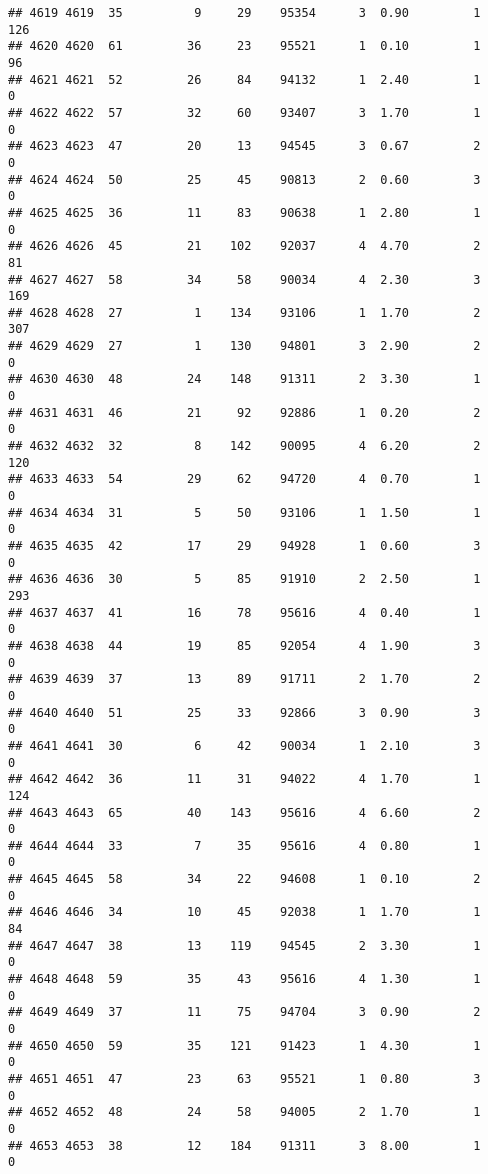 \documentclass[
]{article}
\begin{document}
\begin{verbatim}
## 4619 4619  35          9     29    95354      3  0.90         1      126
## 4620 4620  61         36     23    95521      1  0.10         1       96
## 4621 4621  52         26     84    94132      1  2.40         1        0
## 4622 4622  57         32     60    93407      3  1.70         1        0
## 4623 4623  47         20     13    94545      3  0.67         2        0
## 4624 4624  50         25     45    90813      2  0.60         3        0
## 4625 4625  36         11     83    90638      1  2.80         1        0
## 4626 4626  45         21    102    92037      4  4.70         2       81
## 4627 4627  58         34     58    90034      4  2.30         3      169
## 4628 4628  27          1    134    93106      1  1.70         2      307
## 4629 4629  27          1    130    94801      3  2.90         2        0
## 4630 4630  48         24    148    91311      2  3.30         1        0
## 4631 4631  46         21     92    92886      1  0.20         2        0
## 4632 4632  32          8    142    90095      4  6.20         2      120
## 4633 4633  54         29     62    94720      4  0.70         1        0
## 4634 4634  31          5     50    93106      1  1.50         1        0
## 4635 4635  42         17     29    94928      1  0.60         3        0
## 4636 4636  30          5     85    91910      2  2.50         1      293
## 4637 4637  41         16     78    95616      4  0.40         1        0
## 4638 4638  44         19     85    92054      4  1.90         3        0
## 4639 4639  37         13     89    91711      2  1.70         2        0
## 4640 4640  51         25     33    92866      3  0.90         3        0
## 4641 4641  30          6     42    90034      1  2.10         3        0
## 4642 4642  36         11     31    94022      4  1.70         1      124
## 4643 4643  65         40    143    95616      4  6.60         2        0
## 4644 4644  33          7     35    95616      4  0.80         1        0
## 4645 4645  58         34     22    94608      1  0.10         2        0
## 4646 4646  34         10     45    92038      1  1.70         1       84
## 4647 4647  38         13    119    94545      2  3.30         1        0
## 4648 4648  59         35     43    95616      4  1.30         1        0
## 4649 4649  37         11     75    94704      3  0.90         2        0
## 4650 4650  59         35    121    91423      1  4.30         1        0
## 4651 4651  47         23     63    95521      1  0.80         3        0
## 4652 4652  48         24     58    94005      2  1.70         1        0
## 4653 4653  38         12    184    91311      3  8.00         1        0

\end{verbatim}
\end{document}
